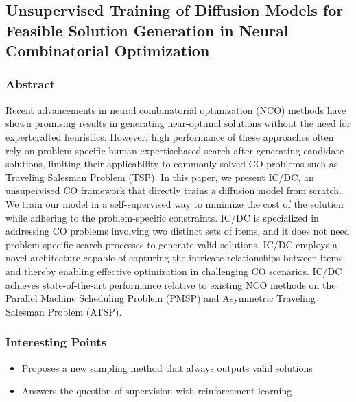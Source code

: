 
\subsection{Unsupervised Training of Diffusion Models for Feasible Solution Generation in
Neural Combinatorial Optimization}
\subsubsection{Abstract}
Recent advancements in neural combinatorial optimization
(NCO) methods have shown promising results in generating near-optimal solutions without the need for expertcrafted heuristics. However, high performance of these approaches often rely on problem-specific human-expertisebased search after generating candidate solutions, limiting
their applicability to commonly solved CO problems such
as Traveling Salesman Problem (TSP). In this paper, we
present IC/DC, an unsupervised CO framework that directly
trains a diffusion model from scratch. We train our model
in a self-supervised way to minimize the cost of the solution
while adhering to the problem-specific constraints. IC/DC
is specialized in addressing CO problems involving two distinct sets of items, and it does not need problem-specific
search processes to generate valid solutions. IC/DC employs a novel architecture capable of capturing the intricate
relationships between items, and thereby enabling effective
optimization in challenging CO scenarios. IC/DC achieves
state-of-the-art performance relative to existing NCO methods on the Parallel Machine Scheduling Problem (PMSP)
and Asymmetric Traveling Salesman Problem (ATSP).

\subsubsection{Interesting Points}
\begin{itemize}
    \item Proposes a new sampling method that always outputs valid solutions
    \item Answers the question of supervision with reinforcement learning
\end{itemize}